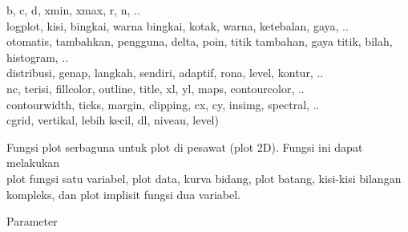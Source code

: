\documentclass{article}
\begin{document}
\begin{eulernotebook}
\begin{eulercomment}
\begin{eulercomment}
\begin{eulercomment}
\begin{eulercomment}
\begin{eulercomment}
\begin{eulercomment}
\begin{eulercomment}
\begin{eulercomment}
\begin{eulercomment}
\begin{eulercomment}
\begin{eulercomment}
\begin{eulercomment}
\begin{eulercomment}
\begin{eulercomment}
\begin{eulercomment}
\begin{eulercomment}
\begin{eulercomment}
\begin{eulercomment}
\begin{eulercomment}
\begin{eulercomment}
\begin{eulercomment}
\begin{eulercomment}
\begin{eulercomment}
\begin{eulercomment}
\begin{eulercomment}
\begin{eulercomment}
\begin{eulercomment}
\begin{eulercomment}
\begin{eulercomment}
\end{eulercomment}
\eulersubheading{}
\begin{eulercomment}
b, c, d, xmin, xmax, r, n, ..\\
logplot, kisi, bingkai, warna bingkai, kotak, warna, ketebalan, gaya,
..\\
otomatis, tambahkan, pengguna, delta, poin, titik tambahan, gaya
titik, bilah, histogram, ..\\
distribusi, genap, langkah, sendiri, adaptif, rona, level, kontur, ..\\
nc, terisi, fillcolor, outline, title, xl, yl, maps, contourcolor, ..\\
contourwidth, ticks, margin, clipping, cx, cy, insimg, spectral, ..\\
cgrid, vertikal, lebih kecil, dl, niveau, level)

Fungsi plot serbaguna untuk plot di pesawat (plot 2D). Fungsi ini
dapat melakukan\\
plot fungsi satu variabel, plot data, kurva bidang, plot batang,
kisi-kisi bilangan kompleks, dan plot implisit fungsi dua variabel.

Parameter


\end{eulercomment}
\end{eulercomment}
\end{eulercomment}
\end{eulercomment}
\end{eulercomment}
\end{eulercomment}
\end{eulercomment}
\end{eulercomment}
\end{eulercomment}
\end{eulercomment}
\end{eulercomment}
\end{eulercomment}
\end{eulercomment}
\end{eulercomment}
\end{eulercomment}
\end{eulercomment}
\end{eulercomment}
\end{eulercomment}
\end{eulercomment}
\end{eulercomment}
\end{eulercomment}
\end{eulercomment}
\end{eulercomment}
\end{eulercomment}
\end{eulercomment}
\end{eulercomment}
\end{eulercomment}
\end{eulercomment}
\end{eulercomment}
\end{eulernotebook}
\end{document}
